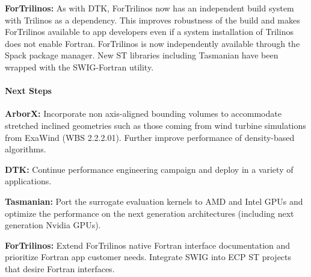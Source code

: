 {\bf ForTrilinos:}
As with DTK, ForTrilinos now has an independent build system with Trilinos as a
dependency. This improves robustness of the build and makes ForTrilinos
available to app developers even if a system installation of Trilinos does not
enable Fortran. ForTrilinos is now independently available through the Spack
package manager. New ST libraries including Tasmanian have been wrapped with the
SWIG-Fortran utility.


\paragraph{Next Steps}

\indent

{\bf ArborX:} Incorporate non axis-aligned bounding volumes to accommodate
stretched inclined geometries such as those coming from wind turbine
simulations from ExaWind (WBS 2.2.2.01). Further improve performance of
density-based algorithms.

{\bf DTK:} Continue performance engineering campaign and deploy in a variety of
applications.

{\bf Tasmanian:} Port the surrogate evaluation kernels to AMD and Intel
GPUs and optimize the performance on the next generation architectures
(including next generation Nvidia GPUs).

{\bf ForTrilinos:} Extend ForTrilinos native Fortran interface documentation and
prioritize Fortran app customer needs. Integrate SWIG into ECP ST projects that
desire Fortran interfaces.

